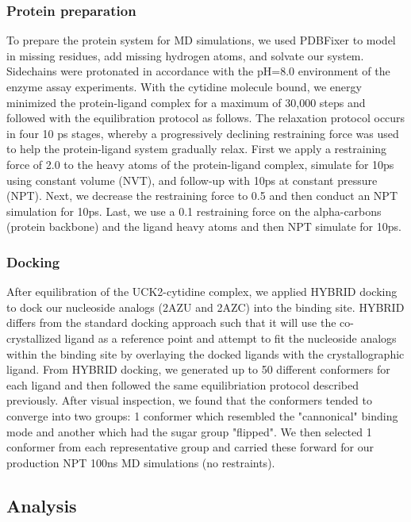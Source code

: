 \documentclass[fleqn,10pt]{wlscirep}
\begin{document}
\subsubsection{Protein preparation}
To prepare the protein system for MD simulations, we used PDBFixer \cite{pdbfixer} to model in missing residues, add missing hydrogen atoms, and solvate our system.
Sidechains were protonated in accordance with the pH=8.0 environment \cite{tanaka et. al 4} of the enzyme assay experiments.
With the cytidine molecule bound, we energy minimized the protein-ligand complex for a maximum of 30,000 steps and followed with the equilibration protocol as follows.
The relaxation protocol occurs in four 10 ps stages, whereby a progressively declining restraining force was used to help the protein-ligand system gradually relax.
First we apply a restraining force of 2.0 to the heavy atoms of the protein-ligand complex, simulate for 10ps using constant volume (NVT), and follow-up with 10ps at constant pressure (NPT).
Next, we decrease the restraining force to 0.5 and then conduct an NPT simulation for 10ps.
Last, we use a 0.1 restraining force on the alpha-carbons (protein backbone) and the ligand heavy atoms and then NPT simulate for 10ps.

\subsubsection{Docking}
After equilibration of the UCK2-cytidine complex, we applied HYBRID docking \cite{} to dock our nucleoside analogs (2AZU and 2AZC) into the binding site.
HYBRID differs from the standard docking approach such that it will use the co-crystallized ligand as a reference point and attempt to fit the nucleoside analogs within the binding site by overlaying the docked ligands with the crystallographic ligand.
From HYBRID docking, we generated up to 50 different conformers for each ligand and then followed the same equilibriation protocol described previously.
After visual inspection, we found that the conformers tended to converge into two groups: 1 conformer which resembled the "cannonical" binding mode and another which had the sugar group "flipped".
We then selected 1 conformer from each representative group and carried these forward for our production NPT 100ns MD simulations (no restraints).

\subsection{Analysis}
\end{document}
